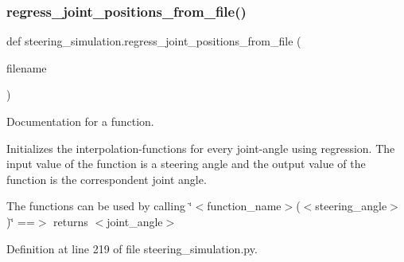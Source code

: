 \subsubsection{\texorpdfstring{regress\_joint\_positions\_from\_file()}{regress\_joint\_positions\_from\_file()}}
{\footnotesize\ttfamily def steering\+\_\+simulation.\+regress\+\_\+joint\+\_\+positions\+\_\+from\+\_\+file (\begin{DoxyParamCaption}\item[{}]{filename }\end{DoxyParamCaption})}



Documentation for a function. 

Initializes the interpolation-\/functions for every joint-\/angle using regression. The input value of the function is a steering angle and the output value of the function is the correspondent joint angle.

The functions can be used by calling \char`\"{}$<$function\+\_\+name$>$($<$steering\+\_\+angle$>$)\char`\"{} ==$>$ returns $<$joint\+\_\+angle$>$ 

Definition at line 219 of file steering\+\_\+simulation.\+py.


